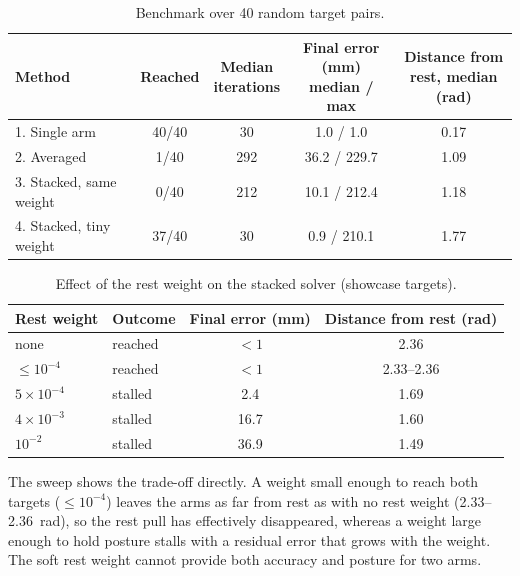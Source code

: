 \documentclass[12pt,a4paper]{article}
\begin{document}
\begin{table}[htbp]
    \centering
    \small
    \setlength{\tabcolsep}{5pt}
    \begin{tabular}{l c c c c}
        \hline
        Method & Reached &
        \shortstack{Median\\iterations} &
        \shortstack{Final error (mm)\\median / max} &
        \shortstack{Distance from\\rest, median (rad)} \\
        \hline
        1. Single arm & 40/40 & 30 & 1.0 / 1.0 & 0.17 \\
        2. Averaged & 1/40 & 292 & 36.2 / 229.7 & 1.09 \\
        3. Stacked, same weight & 0/40 & 212 & 10.1 / 212.4 & 1.18 \\
        4. Stacked, tiny weight & 37/40 & 30 & 0.9 / 210.1 & 1.77 \\
        \hline
    \end{tabular}
    \caption{\small{Benchmark over 40 random target pairs.}}
    \label{tab:bimanual_benchmark}
\end{table}

\begin{table}[htbp]
    \centering
    \begin{tabular}{l l c c}
        \hline
        Rest weight & Outcome & Final error (mm) & Distance from rest (rad) \\
        \hline
        none & reached & $<1$ & 2.36 \\
        $\le 10^{-4}$ & reached & $<1$ & 2.33--2.36 \\
        $5\times10^{-4}$ & stalled & 2.4 & 1.69 \\
        $4\times10^{-3}$ & stalled & 16.7 & 1.60 \\
        $10^{-2}$ & stalled & 36.9 & 1.49 \\
        \hline
    \end{tabular}
    \caption{\small{Effect of the rest weight on the stacked solver (showcase targets).}}
    \label{tab:bimanual_sweep}
\end{table}

The sweep shows the trade-off directly. A weight small enough to reach both
targets ($\le10^{-4}$) leaves the arms as far from rest as with no rest weight
(2.33--2.36~rad), so the rest pull has effectively disappeared, whereas a weight
large enough to hold posture stalls with a residual error that grows with the
weight. The soft rest weight cannot provide both accuracy and posture for two
arms.
\end{document}
